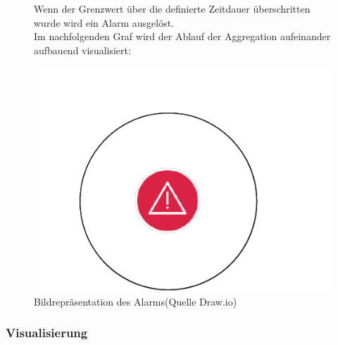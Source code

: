 \documentclass[a4paper,10pt]{scrartcl}
\begin{document}
\begin{figure}[htbp]
\begin{minipage}[t]{6cm}
\vspace{0pt}
Wenn der Grenzwert über die definierte Zeitdauer überschritten wurde wird ein Alarm ausgelöst.\\
Im nachfolgenden Graf wird der Ablauf der Aggregation aufeinander aufbauend visualisiert:
\end{minipage}
\hfill
\begin{minipage}[t]{6cm}
\vspace{0pt}
\centering
  \includegraphics[scale=.3]{img/Datenaggregation/AlarmNew.png}  
\caption{Bildrepräsentation des Alarms(Quelle Draw.io)}
\label{fig:Bild1}
\end{minipage}
\end{figure}



\begin{minipage}{\linewidth}
  \centering
  \scalebox{.8}{} 
\end{minipage}



\subsubsection{Visualisierung}
\end{document}
